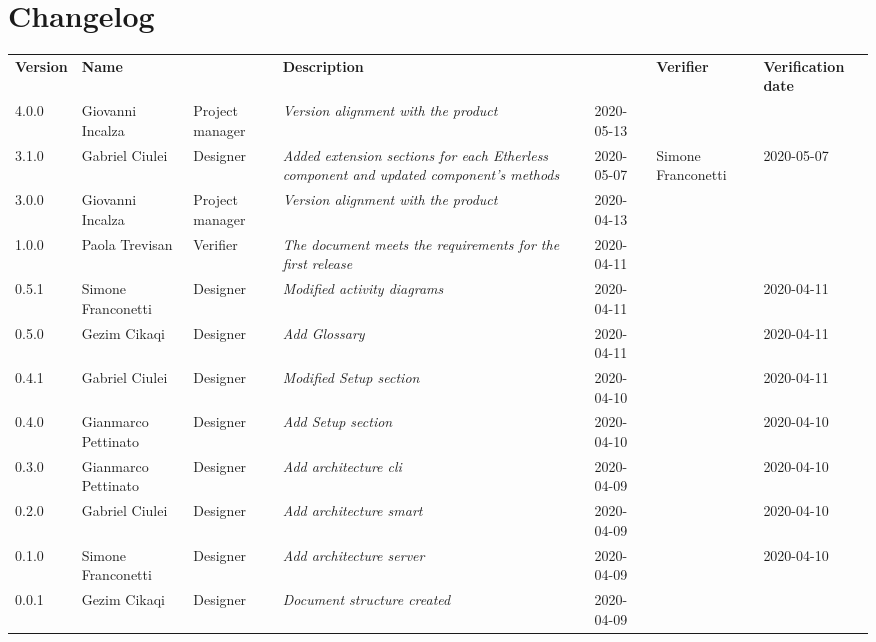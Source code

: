 \section*{Changelog}
\renewcommand{\arraystretch}{1.8}
  \setlength\LTleft{-1.7cm}
  \begin{longtable}{|p{1.7cm}|p{2cm}|p{2.5cm}|p{3cm}|p{1.7cm}|p{2cm}|p{2.3cm}|}
    \hline
    \rowcolor{header}
    \textbf{Version} & \textbf{Name} & \centering{\textbf{Role}} & \textbf{Description} &      \centering{\textbf{Date}} & \textbf{Verifier} & \textbf{Verification date} \\
	4.0.0 & Giovanni Incalza & Project manager & \small{\textit{Version alignment with the product}} & 2020-05-13 &  & \\
 	3.1.0 & Gabriel Ciulei & Designer & \small{\textit{Added extension sections for each Etherless component and updated component's methods}} & 2020-05-07 & Simone Franconetti & 2020-05-07\\
    3.0.0 & Giovanni Incalza & Project manager & \small{\textit{Version alignment with the product}} & 2020-04-13 &  & \\

    1.0.0 & Paola Trevisan & Verifier & \small{\textit{The document meets the requirements for the first release}} & 2020-04-11 &  & \\
    0.5.1 & Simone Franconetti & Designer & \small{\textit{Modified activity diagrams}} & 2020-04-11 &  & 2020-04-11\\
    0.5.0 & Gezim Cikaqi & Designer & \small{\textit{Add Glossary}} & 2020-04-11 &  & 2020-04-11\\
    0.4.1 & Gabriel Ciulei & Designer & \small{\textit{Modified Setup section}} & 2020-04-10 &  & 2020-04-11\\
    0.4.0 & Gianmarco Pettinato & Designer & \small{\textit{Add Setup section}} & 2020-04-10 &  & 2020-04-10\\
    0.3.0 & Gianmarco Pettinato & Designer & \small{\textit{Add architecture cli}} & 2020-04-09 &  & 2020-04-10\\
    0.2.0 & Gabriel Ciulei & Designer & \small{\textit{Add architecture smart}} & 2020-04-09 &  & 2020-04-10\\
    0.1.0 & Simone Franconetti & Designer & \small{\textit{Add architecture server}} & 2020-04-09 &  & 2020-04-10\\
    0.0.1 & Gezim Cikaqi & Designer & \small{\textit{Document structure created}} & 2020-04-09 &  & \\

    \hline
  \end{longtable}
\setlength\LTleft{0cm}
\restoregeometry
